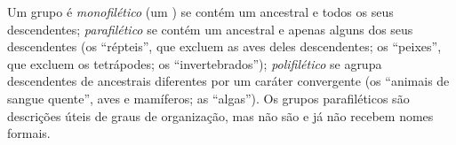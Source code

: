 \begin{definition}\label{def:b1:classifying-biodiversity:monophyly}
Um grupo é \emph{monofilético} (um ) se contém um ancestral e
todos os seus descendentes; \emph{parafilético} se contém um ancestral
e apenas alguns dos seus descendentes (os ``répteis'', que excluem as
aves deles descendentes; os ``peixes'', que excluem os tetrápodes; os
``invertebrados''); \emph{polifilético} se agrupa descendentes de
ancestrais diferentes por um caráter convergente (os ``animais de
sangue quente'', aves e mamíferos; as ``algas''). Os grupos
parafiléticos são descrições úteis de graus de organização, mas não são
 e já não recebem nomes formais.
\end{definition}

